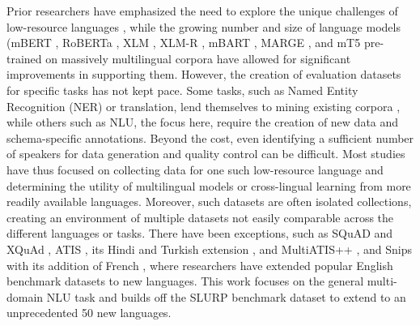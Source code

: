 \documentclass[11pt]{article}
\begin{document}
Prior researchers have emphasized the need to explore the unique challenges of low-resource languages \citep{simpson2008human, strassel-tracey-2016-lorelei, cruz2020establishing, lakew2020low, marivate-etal-2020-investigating, magueresse2020lowresource, goyal2021flores101}, while the growing number and size of language models (mBERT \citep{devlinmBERT}, RoBERTa \citep{liu2019roberta}, XLM \citep{lample2019crosslingual}, XLM-R \citep{conneau-etal-2020-unsupervised}, mBART \citep{liu2020multilingual}, MARGE \citep{lewis2020pretraining}, and mT5 \citep{xue-etal-2021-mt5} pre-trained on massively multilingual corpora have allowed for significant improvements in supporting them.
However, the creation of evaluation datasets for specific tasks has not kept pace.
Some tasks,  such as Named Entity Recognition (NER) or translation, lend themselves to mining existing corpora \citep{TIEDEMANN12.463,Pan2017CrosslingualNT,hu2020xtreme}, while others such as NLU, the focus here, require the creation of new data and schema-specific annotations.
Beyond the cost, even identifying a sufficient number of speakers for data generation and quality control can be difficult.
Most studies have thus focused on collecting data for one such low-resource language and determining the utility of multilingual models or cross-lingual learning from more readily available languages.
Moreover, such datasets are often isolated collections, creating an environment of multiple datasets not easily comparable across the different languages or tasks.
There have been exceptions, such as SQuAD \citep{rajpurkar2016squad} and XQuAd \citep{Artetxe:etal:2019}, ATIS \citep{price-1990-evaluation}, its Hindi and Turkish extension \citep{8461905}, and MultiATIS++ \citep{xu-etal-2020-end}, and Snips \citep{coucke2018snips} with its addition of French \citep{saade2019spoken}, where researchers have extended popular English benchmark datasets to new languages.
This work focuses on the general multi-domain NLU task and builds off the SLURP \citep{bastianelli-etal-2020-slurp} benchmark dataset to extend to an unprecedented 50 new languages.
\end{document}
